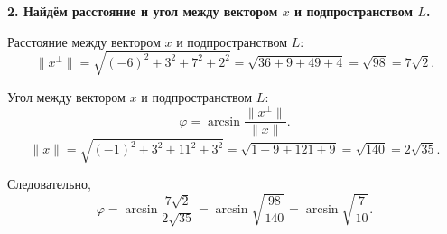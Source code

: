 \bigskip

\textbf{2. Найдём расстояние и угол между вектором $x$ и подпространством $L$.}

Расстояние между вектором $x$ и подпространством $L$:
\[
\|x^\perp\|=\sqrt{(-6)^2+3^2+7^2+2^2}=\sqrt{36+9+49+4}=\sqrt{98}=7\sqrt2.
\]

Угол между вектором $x$ и подпространством $L$:
\[
\varphi=\arcsin\frac{\|x^\perp\|}{\|x\|}.
\]
\[
\|x\|=\sqrt{(-1)^2+3^2+11^2+3^2}=\sqrt{1+9+121+9}=\sqrt{140}=2\sqrt{35}.
\]

Следовательно,
\[
\varphi=\arcsin\frac{7\sqrt2}{2\sqrt{35}}
=
\arcsin\sqrt{\frac{98}{140}}
=
\arcsin\sqrt{\frac{7}{10}}.
\]
